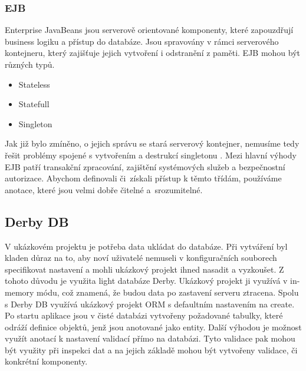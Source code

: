 \subsubsection{EJB}
Enterprise JavaBeans \cite{javaEETutorial} jsou serverově orientované komponenty, které zapouzdřují business logiku a přístup do databáze. Jsou spravovány v rámci serverového kontejneru, který zajišťuje jejich vytvoření i odstranění z paměti. EJB mohou být různých typů.
\begin{itemize}
\item Stateless
\item Statefull
\item Singleton
\end{itemize}
Jak již bylo zmíněno, o jejich správu se stará serverový kontejner, nemusíme tedy řešit problémy spojené s vytvořením a destrukcí singletonu \cite{gamma}. Mezi hlavní výhody EJB patří transakční zpracování, zajištění systémových služeb a bezpečnostní autorizace. Abychom definovali či~získali přístup k těmto třídám, používáme anotace, které jsou velmi dobře čitelné a~srozumitelné.
\subsection{Derby DB}
V ukázkovém projektu je potřeba data ukládat do databáze. Při vytváření byl kladen důraz na to, aby noví uživatelé nemuseli v konfiguračních souborech specifikovat nastavení a mohli ukázkový projekt ihned nasadit a vyzkoušet. Z tohoto důvodu je využita light databáze Derby. Ukázkový projekt ji využívá v in-memory módu, což znamená, že budou data po zastavení serveru ztracena. Spolu s Derby DB využívá ukázkový projekt ORM s defaultním nastavením na create. Po startu aplikace jsou v čisté databázi vytvořeny požadované tabulky, které odráží definice objektů, jenž jsou anotované jako entity. Další výhodou je možnost využít anotací k nastavení validací přímo na databázi. Tyto validace pak mohou být využity při inspekci dat a na jejich základě mohou být vytvořeny validace, či konkrétní komponenty.